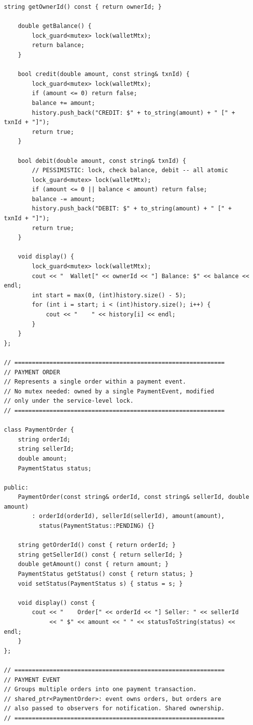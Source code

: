 \documentclass[11pt,a4paper]{article}
\begin{document}
\begin{lstlisting}[title={\texttt{models.hpp}}]
    string getOwnerId() const { return ownerId; }

    double getBalance() {
        lock_guard<mutex> lock(walletMtx);
        return balance;
    }

    bool credit(double amount, const string& txnId) {
        lock_guard<mutex> lock(walletMtx);
        if (amount <= 0) return false;
        balance += amount;
        history.push_back("CREDIT: $" + to_string(amount) + " [" + txnId + "]");
        return true;
    }

    bool debit(double amount, const string& txnId) {
        // PESSIMISTIC: lock, check balance, debit -- all atomic
        lock_guard<mutex> lock(walletMtx);
        if (amount <= 0 || balance < amount) return false;
        balance -= amount;
        history.push_back("DEBIT: $" + to_string(amount) + " [" + txnId + "]");
        return true;
    }

    void display() {
        lock_guard<mutex> lock(walletMtx);
        cout << "  Wallet[" << ownerId << "] Balance: $" << balance << endl;
        int start = max(0, (int)history.size() - 5);
        for (int i = start; i < (int)history.size(); i++) {
            cout << "    " << history[i] << endl;
        }
    }
};

// ============================================================
// PAYMENT ORDER
// Represents a single order within a payment event.
// No mutex needed: owned by a single PaymentEvent, modified
// only under the service-level lock.
// ============================================================

class PaymentOrder {
    string orderId;
    string sellerId;
    double amount;
    PaymentStatus status;

public:
    PaymentOrder(const string& orderId, const string& sellerId, double amount)
        : orderId(orderId), sellerId(sellerId), amount(amount),
          status(PaymentStatus::PENDING) {}

    string getOrderId() const { return orderId; }
    string getSellerId() const { return sellerId; }
    double getAmount() const { return amount; }
    PaymentStatus getStatus() const { return status; }
    void setStatus(PaymentStatus s) { status = s; }

    void display() const {
        cout << "    Order[" << orderId << "] Seller: " << sellerId
             << " $" << amount << " " << statusToString(status) << endl;
    }
};

// ============================================================
// PAYMENT EVENT
// Groups multiple orders into one payment transaction.
// shared_ptr<PaymentOrder>: event owns orders, but orders are
// also passed to observers for notification. Shared ownership.
// ============================================================


\end{lstlisting}
\end{document}
